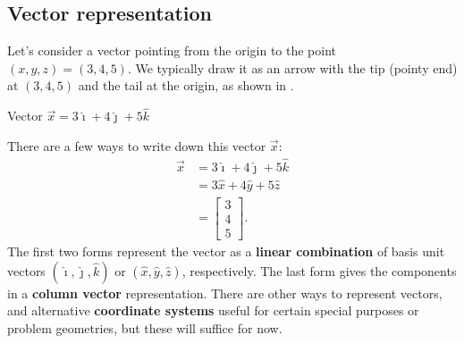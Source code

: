 \documentclass{tufte-handout}
\begin{document}
\subsection{Vector representation}
Let's consider a vector pointing from the origin to the point $(x,y,z)=(3,4,5)$. We typically draw it as an arrow with the tip (pointy end) at $(3,4,5)$ and the tail at the origin, as shown in . 
\begin{marginfigure}
\caption{Vector $\vec{x}=3\hat{\imath} + 4\hat{\jmath} + 5\hat{k}$}
\label{fig:vector1}
\end{marginfigure}
There are a few ways to write down this vector $\vec{x}$:
\begin{align}
\vec{x} &= 3\hat{\imath} + 4\hat{\jmath} + 5\hat{k} \\
&= 3\hat{x} + 4\hat{y} + 5\hat{z} \\
&= \begin{bmatrix} 3 \\ 4 \\ 5 \end{bmatrix}. 
\end{align}
The first two forms represent the vector as a \textbf{linear combination} of basis unit vectors $(\hat{\imath}, \hat{\jmath}, \hat{k})$ or $(\hat{x}, \hat{y}, \hat{z})$, respectively. The last form gives the components in a \textbf{column vector} representation. There are other ways to represent vectors, and alternative \textbf{coordinate systems} useful for certain special purposes or problem geometries, but these will suffice for now. 
\end{document}
